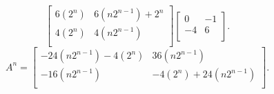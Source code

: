 \documentclass{report}
\begin{document}
{\[\begin{bmatrix}
      6 \left( 2 ^{n} \right)  & 6 \left(  n 2 ^{n-1} \right) + 2 ^{n}\\
       4 \left( 2 ^{n} \right) & 4 \left( n 2 ^{n-1} \right) \\
      \end{bmatrix}       \begin{bmatrix}
      0 & -1\\
      -4 & 6\\
      \end{bmatrix}
      .\] 
      \[
      A ^{n} = \begin{bmatrix}
      -24 \left( n 2 ^{n-1} \right) -4 \left( 2^{n} \right)  & 36 \left( n 2 ^{n-1} \right) \\
       -16 \left( n 2 ^{n-1} \right) & -4 \left( 2^{n} \right) + 24 \left( n 2 ^{n-1} \right) \\
      \end{bmatrix}
      .\] 
   }
\end{document}
